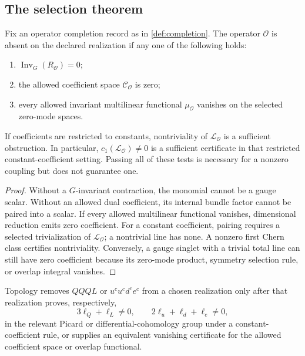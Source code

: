\documentclass[11pt]{article}
\newcommand{\Inv}{\operatorname{Inv}}
\newcommand{\cOne}{c_1}
\newcommand{\Line}{\mathcal{L}}
\newcommand{\Coeff}{\mathcal{C}}
\newcommand{\Ops}{\mathcal{O}}
\begin{document}
\subsection{The selection theorem}

\begin{theorem}\label{thm:selection}
Fix an operator completion record as in \cref{def:completion}. The operator
\(\Ops\) is absent on the declared realization if any one of the following
holds:
\begin{enumerate}
\item \(\Inv_G(R_{\Ops})=0\);
\item the allowed coefficient space \(\Coeff_{\Ops}\) is zero;
\item every allowed invariant multilinear functional
\(\mu_{\Ops}\) vanishes on the selected zero-mode spaces.
\end{enumerate}
If coefficients are restricted to constants, nontriviality of
\(\Line_{\Ops}\) is a sufficient obstruction. In particular,
\(\cOne(\Line_{\Ops})\ne0\) is a sufficient certificate in that restricted
constant-coefficient setting. Passing all of these tests is necessary for a
nonzero coupling but does not guarantee one.
\end{theorem}

\begin{proof}
Without a \(G\)-invariant contraction, the monomial cannot be a gauge
scalar. Without an allowed dual coefficient, its internal bundle factor
cannot be paired into a scalar. If every allowed multilinear functional
vanishes, dimensional reduction emits zero coefficient. For a constant
coefficient, pairing requires a selected trivialization of
\(\Line_{\Ops}\); a nontrivial line has none. A nonzero first Chern class
certifies nontriviality. Conversely, a gauge singlet with a trivial total
line can still have zero coefficient because its zero-mode product,
symmetry selection rule, or overlap integral vanishes.
\end{proof}

\begin{corollary}
\label{cor:proton}
Topology removes \(QQQL\) or \(u^cu^cd^ce^c\) from a chosen realization only
after that realization proves, respectively,
\[
3\ell_Q+\ell_L\ne0,
\qquad
2\ell_u+\ell_d+\ell_e\ne0,
\]
in the relevant Picard or differential-cohomology group under a
constant-coefficient rule, or supplies an equivalent vanishing certificate
for the allowed coefficient space or overlap functional.
\end{corollary}
\end{document}

